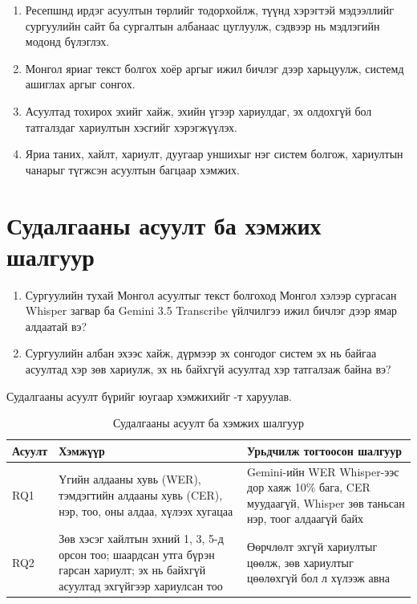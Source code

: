 \begin{enumerate}
    \item Ресепшнд ирдэг асуултын төрлийг тодорхойлж, түүнд хэрэгтэй мэдээллийг сургуулийн сайт ба сургалтын албанаас цуглуулж, сэдвээр нь мэдлэгийн модонд бүлэглэх.
    \item Монгол яриаг текст болгох хоёр аргыг ижил бичлэг дээр харьцуулж, системд ашиглах аргыг сонгох.
    \item Асуултад тохирох эхийг хайж, эхийн үгээр хариулдаг, эх олдохгүй бол татгалздаг хариултын хэсгийг хэрэгжүүлэх.
    \item Яриа таних, хайлт, хариулт, дуугаар уншихыг нэг систем болгож, хариултын чанарыг түгжсэн асуултын багцаар хэмжих.
\end{enumerate}

\section{Судалгааны асуулт ба хэмжих шалгуур}
\label{sec:rq}

\begin{enumerate}[label=\textbf{RQ\arabic*.}]
    \item Сургуулийн тухай Монгол асуултыг текст болгоход Монгол хэлээр сургасан Whisper загвар ба Gemini 3.5 Transcribe үйлчилгээ ижил бичлэг дээр ямар алдаатай вэ?
    \item Сургуулийн албан эхээс хайж, дүрмээр эх сонгодог систем эх нь байгаа асуултад хэр зөв хариулж, эх нь байхгүй асуултад хэр татгалзаж байна вэ?
\end{enumerate}

Судалгааны асуулт бүрийг юугаар хэмжихийг -т харуулав.

\begin{table}[H]
\centering
\caption{Судалгааны асуулт ба хэмжих шалгуур}
\label{tab:rq_metrics}
\begin{tabular}{|p{1.4cm}|p{6.2cm}|p{6.2cm}|}
\hline
\textbf{Асуулт} & \textbf{Хэмжүүр} & \textbf{Урьдчилж тогтоосон шалгуур} \\
\hline
RQ1 & Үгийн алдааны хувь (\ac{WER}), тэмдэгтийн алдааны хувь (\ac{CER}), нэр, тоо, оны алдаа, хүлээх хугацаа & Gemini-ийн WER Whisper-ээс дор хаяж 10\% бага, CER муудаагүй, Whisper зөв таньсан нэр, тоог алдаагүй байх \\
\hline
RQ2 & Зөв хэсэг хайлтын эхний 1, 3, 5-д орсон тоо; шаардсан утга бүрэн гарсан хариулт; эх нь байхгүй асуултад эхгүйгээр хариулсан тоо & Өөрчлөлт эхгүй хариултыг цөөлж, зөв хариултыг цөөлөхгүй бол л хүлээж авна \\
\hline
\end{tabular}
\end{table}

